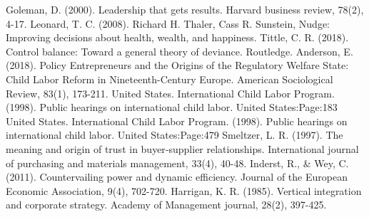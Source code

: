 \documentclass[a4paper, oneside, 11pt]{memoir}
\begin{document}
  
\begin{thebibliography}{9}
    Goleman, D. (2000). Leadership that gets results. Harvard business review, 78(2), 4-17.
    Leonard, T. C. (2008). Richard H. Thaler, Cass R. Sunstein, Nudge: Improving decisions about health, wealth, and happiness.
    Tittle, C. R. (2018). Control balance: Toward a general theory of deviance. Routledge.
    Anderson, E. (2018). Policy Entrepreneurs and the Origins of the Regulatory Welfare State: Child Labor Reform in Nineteenth-Century Europe. American Sociological Review, 83(1), 173-211.
    United States. International Child Labor Program. (1998). Public hearings on international child labor. United States:Page:183
    United States. International Child Labor Program. (1998). Public hearings on international child labor. United States:Page:479
    Smeltzer, L. R. (1997). The meaning and origin of trust in buyer‐supplier relationships. International journal of purchasing and materials management, 33(4), 40-48.
    Inderst, R., \& Wey, C. (2011). Countervailing power and dynamic efficiency. Journal of the European Economic Association, 9(4), 702-720.
    Harrigan, K. R. (1985). Vertical integration and corporate strategy. Academy of Management journal, 28(2), 397-425.
\end{thebibliography}
\end{document}
